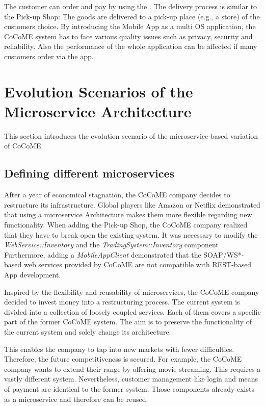 The customer can order and pay by using the . 
The delivery process is similar to the Pick-up Shop: The goods are delivered to a pick-up place (e.g., a store) of the customers choice.
By introducing the Mobile App as a multi OS application, the CoCoME system has to face various quality issues such as privacy, security and reliability. 
Also the performance of the whole application can be affected if many customers order via the app.





\section{Evolution Scenarios of the Microservice Architecture}
This section introduces the evolution scenario of the microservice-based variation of CoCoME.
\subsection{Defining different microservices}
After a year of economical stagnation, the CoCoME company decides to restructure its infrastructure. Global players like Amazon or Netflix demonstrated that using a microservice Architecture makes them more flexible regarding new functionality. When adding the Pick-up Shop, the CoCoME company realized that they have to break open the existing system. It was necessary to modify the \textit{WebService::Inventory} and the \textit{TradingSystem::Inventory} component~\cite{HeinrichRostamiReussner2016_1000052688}. Furthermore, adding a \textit{MobileAppClient} demonstrated that the SOAP/WS*-based web services provided by CoCoME are not compatible with REST-based App development.

Inspired by the flexibility and reusability of microservices, the CoCoME company decided to invest money into a restructuring process. The current system is divided into a collection of loosely coupled services. Each of them covers a specific part of the former CoCoME system. The aim is to preserve the functionality of the current system and solely change its architecture.

This enables the company to tap into new markets with fewer difficulties. 
Therefore, the future competitiveness is secured. 
For example, the CoCoME company wants to extend their  range by offering movie streaming.%
This requires a vastly different system. 
Nevertheless, customer management like login and means of payment are identical to the former \CoCoME system. 
Those components already exists as a microservice and therefore can be reused. 








	
	
